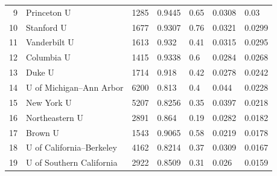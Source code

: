 \documentclass[12pt]{article}
\numberwithin{equation}{subsection}
\theoremstyle{definition}
\begin{document}
\begin{table}[]
\begin{tabular}{r|l|r|l|l|l|l}
9                                  & Princeton U                           & 1285                                 & 0.9445                  & 0.65           & 0.0308              & 0.03                                \\
10                                 & Stanford U                            & 1677                                 & 0.9307                  & 0.76           & 0.0321              & 0.0299                              \\
11                                 & Vanderbilt U                          & 1613                                 & 0.932                   & 0.41           & 0.0315              & 0.0295                              \\
12                                 & Columbia U    & 1415                                 & 0.9338                  & 0.6            & 0.0284              & 0.0268                              \\
13                                 & Duke U                                & 1714                                 & 0.918                   & 0.42           & 0.0278              & 0.0242                              \\
14                                 & U of Michigan--Ann Arbor               & 6200                                 & 0.813                   & 0.4            & 0.044               & 0.0228                              \\
15                                 & New York U                            & 5207                                 & 0.8256                  & 0.35           & 0.0397              & 0.0218                              \\
16                                 & Northeastern U                        & 2891                                 & 0.864                   & 0.19           & 0.0282              & 0.0182                              \\
17                                 & Brown U                               & 1543                                 & 0.9065                  & 0.58           & 0.0219              & 0.0178                              \\
18                                 & U of California--Berkeley              & 4162                                 & 0.8214                  & 0.37           & 0.0309              & 0.0167                              \\
19                                 & U of Southern California              & 2922                                 & 0.8509                  & 0.31           & 0.026               & 0.0159                              \\

\end{tabular}
\end{table}
\end{document}
